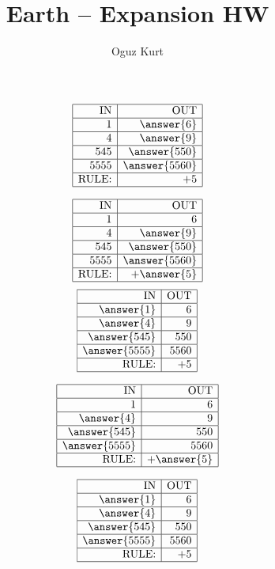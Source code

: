 \documentclass{ximera}
\title{Earth -- Expansion HW \hfill \makebox[0.5\textwidth]{Name:\enspace\hrulefill}}
\author{Oguz Kurt}
\begin{document}
\begin{abstract}
\empty
\end{abstract}

\begin{problem}
$$\begin{array}{|r|r|}
\hline
\text{IN} & \text{OUT} \\ 
\hline 1& \answer{6} \\ 
\hline 4& \answer{9} \\ 
\hline 545& \answer{550} \\ 
\hline 5555& \answer{5560} \\ 
\hline \text{RULE:} &+5\\ 
\hline 
\end{array}$$

$$\begin{array}{|r|r|}
\hline\text{IN} & \text{OUT} \\ 
\hline 1&6 \\ 
\hline 4& \answer{9} \\ 
\hline 545& \answer{550} \\ 
\hline 5555& \answer{5560} \\ 
\hline \text{RULE:} &+\answer{5} \\ 
\hline 
\end{array}$$
$$\begin{array}{|r|r|}
\hline\text{IN} & \text{OUT} \\ 
\hline\answer{1} &6\\ 
\hline \answer{4} &9\\ 
\hline \answer{545} &550\\ 
\hline \answer{5555} &5560\\ 
\hline \text{RULE:} &+5\\ 
\hline 
\end{array}
$$

$$\begin{array}{|r|r|}
\hline\text{IN} & \text{OUT} \\ 
\hline 1&6 \\ 
\hline \answer{4} &9\\ 
\hline \answer{545} &550\\ 
\hline \answer{5555} &5560\\ 
\hline \text{RULE:} &+\answer{5} \\ 
\hline 
\end{array}$$

$$\begin{array}{|r|r|}
\hline\text{IN} & \text{OUT} \\ 
\hline\answer{1} &6\\ 
\hline \answer{4} &9\\ 
\hline \answer{545} &550\\ 
\hline \answer{5555} &5560\\ 
\hline \text{RULE:} &+5\\ 
\hline 
\end{array}
$$


\end{problem}
\end{document}
